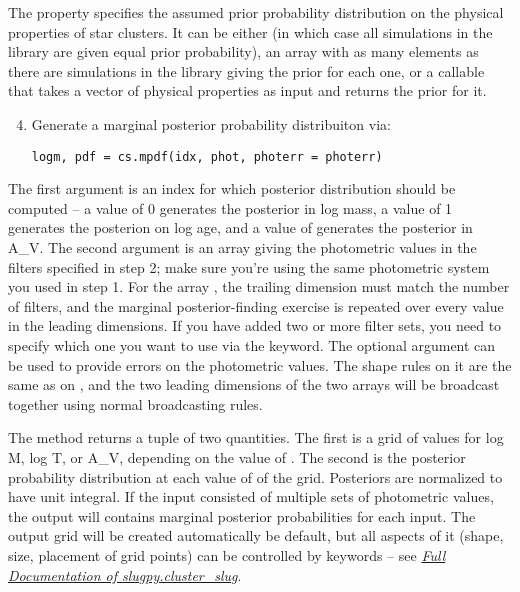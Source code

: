 \documentclass[letterpaper,10pt,english]{sphinxmanual}
\begin{document}
The  property specifies the assumed prior probability distribution on the physical properties of star clusters. It can be either  (in which case all simulations in the library are given equal prior probability), an array with as many elements as there are simulations in the library giving the prior for each one, or a callable that takes a vector of physical properties as input and returns the prior for it.
\begin{enumerate}
\setcounter{enumi}{3}
\item {} 
Generate a marginal posterior probability distribuiton via:

\begin{Verbatim}[commandchars=\\\{\}]
logm, pdf = cs.mpdf(idx, phot, photerr = photerr)
\end{Verbatim}

\end{enumerate}

The first argument  is an index for which posterior distribution should be computed -- a value of 0 generates the posterior in log mass, a value of 1 generates the posterion on log age, and a value of generates the posterior in A\_V. The second argument  is an array giving the photometric values in the filters specified in step 2; make sure you're using the same photometric system you used in step 1. For the array , the trailing dimension must match the number of filters, and the marginal posterior-finding exercise is repeated over every value in the leading dimensions. If you have added two or more filter sets, you need to specify which one you want to use via the  keyword. The optional argument  can be used to provide errors on the photometric values. The shape rules on it are the same as on , and the two leading dimensions of the two arrays will be broadcast together using normal broadcasting rules.

The  method returns a tuple of two quantities. The first is a grid of values for log M, log T, or A\_V, depending on the value of . The second is the posterior probability distribution at each value of of the grid. Posteriors are normalized to have unit integral. If the input consisted of multiple sets of photometric values, the output will contains marginal posterior probabilities for each input. The output grid will be created automatically be default, but all aspects of it (shape, size, placement of grid points) can be controlled by keywords -- see {\hyperref[cluster_slug:ssec\string-cluster\string-slug\string-full]{\emph{Full Documentation of slugpy.cluster\_slug}}}.
\end{document}
